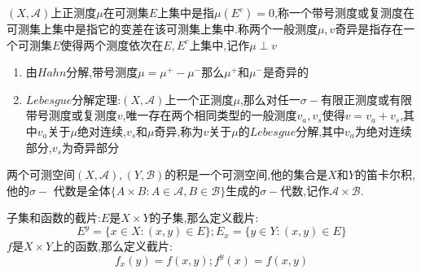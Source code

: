 $(X,\mathscr{A})$上正测度$\mu$在可测集$E$上集中是指$\mu(E^c)=0$,称一个带号测度或复测度在可测集上集中是指它的变差在该可测集上集中.称两个一般测度$\mu,v$奇异是指存在一个可测集$E$使得两个测度依次在$E,E^c$上集中,记作$\mu\perp v$

\begin{enumerate}
  \item 由$Hahn$分解,带号测度$\mu=\mu^+-\mu^-$那么$\mu^+$和$\mu^-$是奇异的
  \item $Lebesgue$分解定理:$(X,\mathscr{A})$上一个正测度$\mu$,那么对任一$\sigma-$有限正测度或有限带号测度或复测度$v$,唯一存在两个相同类型的一般测度$v_a,v_s$使得$v=v_a+v_s$,其中$v_a$关于$\mu$绝对连续,$v_s$和$\mu$奇异,称为$v$关于$\mu$的$Lebesgue$分解,其中$v_a$为绝对连续部分,$v_s$为奇异部分
\end{enumerate}

两个可测空间$(X,\mathscr{A}),(Y,\mathscr{B})$的积是一个可测空间,他的集合是$X$和$Y$的笛卡尔积,他的$\sigma-$ 代数是全体$\{A\times B:A\in\mathscr{A},B\in\mathscr{B}\}$生成的$\sigma-$代数,记作$\mathscr{A}\times\mathscr{B}$.

子集和函数的截片:$E$是$X\times Y$的子集,那么定义截片:$$E^y=\{x\in X:(x,y)\in E\};E_x=\{y\in Y:(x,y)\in E\}$$
$f$是$X\times Y$上的函数,那么定义截片:$$f_x(y)=f(x,y);f^y(x)=f(x,y)$$

